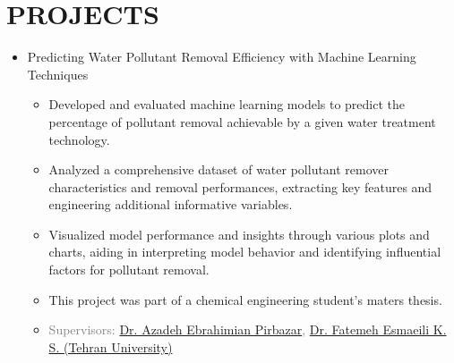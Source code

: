 \documentclass[11pt,letter,sans]{moderncv} %
\begin{document}
\section{PROJECTS}
    \begin{itemize}
        \vspace{0.5em}
        
        \item Predicting Water Pollutant Removal Efficiency with Machine Learning Techniques
            \begin{itemize}
                \item Developed and evaluated machine learning models to predict the percentage of pollutant removal achievable by a given water treatment technology.
                \item Analyzed a comprehensive dataset of water pollutant remover characteristics and removal performances, extracting key features and engineering additional informative variables.
                \item Visualized model performance and insights through various plots and charts, aiding in interpreting model behavior and identifying influential factors for pollutant removal.
                \item This project was part of a chemical engineering student's maters thesis.
                \item \textcolor{gray}{Supervisors: \href{https://profile.ut.ac.ir/en/~aebrahimian}{Dr. Azadeh Ebrahimian Pirbazar}, \href{https://profile.ut.ac.ir/en/~f.esmaeili.kh}{Dr. Fatemeh Esmaeili K. S.  (Tehran University)}}
            \end{itemize}
        \vspace{0.5em}


\end{itemize}
\end{document}
